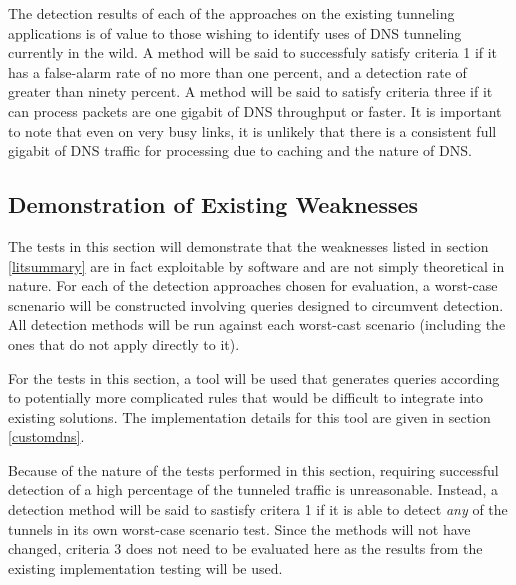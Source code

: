 \documentclass[12pt]{report}
\theoremstyle{remark}
\theoremstyle{definition}
\theoremstyle{definition}
\theoremstyle{definition}
\begin{document}
The detection results of each of the approaches on the existing tunneling applications is of value to those wishing to identify uses of DNS tunneling currently in the wild. A method will be said to successfuly satisfy criteria 1 if it has a false-alarm rate of no more than one percent, and a detection rate of greater than ninety percent. A method will be said to satisfy criteria three if it can process packets are one gigabit of DNS throughput or faster. It is important to note that even on very busy links, it is unlikely that there is a consistent full gigabit of DNS traffic for processing due to caching and the nature of DNS.

\subsection{Demonstration of Existing Weaknesses}
\label{weaknesstest}
The tests in this section will demonstrate that the weaknesses listed in section \ref{litsummary} are in fact exploitable by software and are not simply theoretical in nature. For each of the detection approaches chosen for evaluation, a worst-case scnenario will be constructed involving queries designed to circumvent detection. All detection methods will be run against each worst-cast scenario (including the ones that do not apply directly to it).

For the tests in this section, a tool will be used that generates queries according to potentially more complicated rules that would be difficult to integrate into existing solutions. The implementation details for this tool are given in section \ref{customdns}.

Because of the nature of the tests performed in this section, requiring successful detection of a high percentage of the tunneled traffic is unreasonable. Instead, a detection method will be said to sastisfy critera 1 if it is able to detect \emph{any} of the tunnels in its own worst-case scenario test. Since the methods will not have changed, criteria 3 does not need to be evaluated here as the results from the existing implementation testing will be used.

\end{document}
